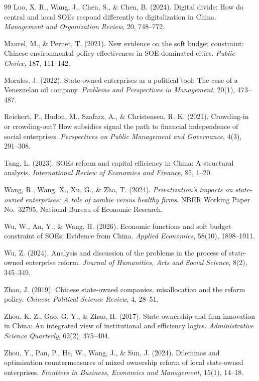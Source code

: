 \documentclass[11pt,a4paper]{article}
\begin{document}
\begin{thebibliography}{99}
 Luo, X. R., Wang, J., Chen, S., \& Chen, B. (2024). Digital divide: How do central and local SOEs respond differently to digitalization in China. \emph{Management and Organization Review}, 20, 748--772.

 Maurel, M., \& Pernet, T. (2021). New evidence on the soft budget constraint: Chinese environmental policy effectiveness in SOE-dominated cities. \emph{Public Choice}, 187, 111--142.

 Morales, J. (2022). State-owned enterprises as a political tool: The case of a Venezuelan oil company. \emph{Problems and Perspectives in Management}, 20(1), 473--487.

 Reichert, P., Hudon, M., Szafarz, A., \& Christensen, R. K. (2021). Crowding-in or crowding-out? How subsidies signal the path to financial independence of social enterprises. \emph{Perspectives on Public Management and Governance}, 4(3), 291--308.

 Tang, L. (2023). SOEs reform and capital efficiency in China: A structural analysis. \emph{International Review of Economics and Finance}, 85, 1--20.

 Wang, R., Wang, X., Xu, G., \& Zha, T. (2024). \emph{Privatization's impacts on state-owned enterprises: A tale of zombie versus healthy firms}. NBER Working Paper No.~32795, National Bureau of Economic Research.

 Wu, W., An, Y., \& Wang, H. (2026). Economic functions and soft budget constraint of SOEs: Evidence from China. \emph{Applied Economics}, 58(10), 1898--1911.

 Wu, Z. (2024). Analysis and discussion of the problems in the process of state-owned enterprise reform. \emph{Journal of Humanities, Arts and Social Science}, 8(2), 345--349.

 Zhao, J. (2019). Chinese state-owned companies, misallocation and the reform policy. \emph{Chinese Political Science Review}, 4, 28--51.

 Zhou, K. Z., Gao, G. Y., \& Zhao, H. (2017). State ownership and firm innovation in China: An integrated view of institutional and efficiency logics. \emph{Administrative Science Quarterly}, 62(2), 375--404.

 Zhou, Y., Pan, P., He, W., Wang, J., \& Sun, J. (2024). Dilemmas and optimisation countermeasures of mixed ownership reform of local state-owned enterprises. \emph{Frontiers in Business, Economics and Management}, 15(1), 14--18.

\end{thebibliography}
\end{document}
